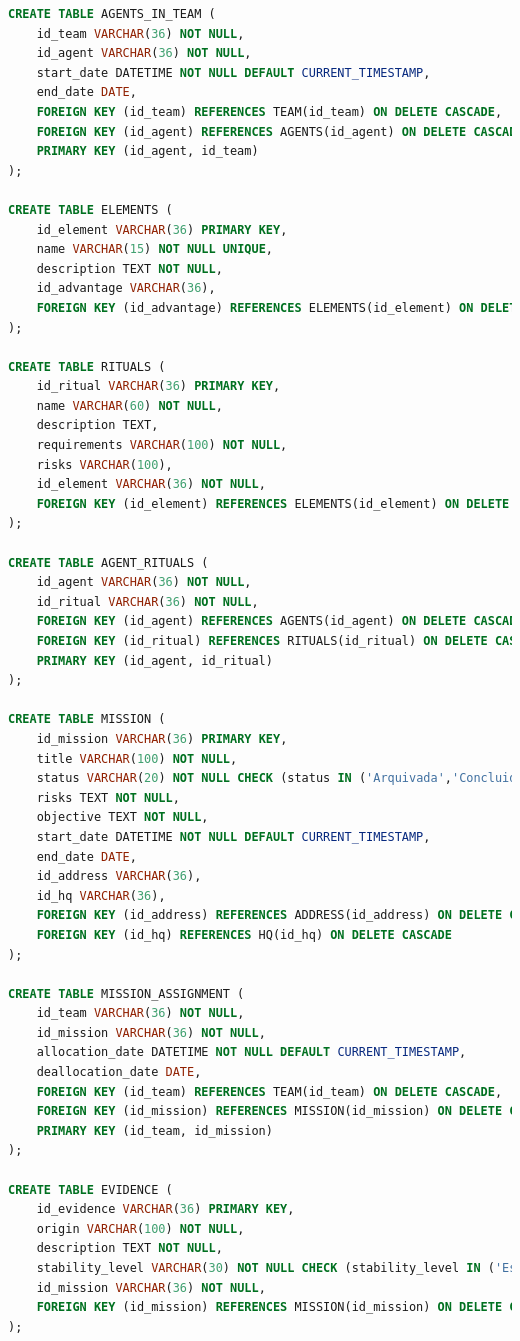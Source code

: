 \documentclass[12pt,a4paper]{report}
\begin{document}
\begin{lstlisting}[language=SQL, caption=ordemdb.sql]
CREATE TABLE AGENTS_IN_TEAM (
    id_team VARCHAR(36) NOT NULL,
    id_agent VARCHAR(36) NOT NULL,
    start_date DATETIME NOT NULL DEFAULT CURRENT_TIMESTAMP,
    end_date DATE,
    FOREIGN KEY (id_team) REFERENCES TEAM(id_team) ON DELETE CASCADE,
    FOREIGN KEY (id_agent) REFERENCES AGENTS(id_agent) ON DELETE CASCADE,
    PRIMARY KEY (id_agent, id_team)
);

CREATE TABLE ELEMENTS (
    id_element VARCHAR(36) PRIMARY KEY,
    name VARCHAR(15) NOT NULL UNIQUE,
    description TEXT NOT NULL,
    id_advantage VARCHAR(36),
    FOREIGN KEY (id_advantage) REFERENCES ELEMENTS(id_element) ON DELETE CASCADE
);

CREATE TABLE RITUALS (
    id_ritual VARCHAR(36) PRIMARY KEY,
    name VARCHAR(60) NOT NULL,
    description TEXT,
    requirements VARCHAR(100) NOT NULL,
    risks VARCHAR(100),
    id_element VARCHAR(36) NOT NULL,
    FOREIGN KEY (id_element) REFERENCES ELEMENTS(id_element) ON DELETE CASCADE
);

CREATE TABLE AGENT_RITUALS (
    id_agent VARCHAR(36) NOT NULL,
    id_ritual VARCHAR(36) NOT NULL,
    FOREIGN KEY (id_agent) REFERENCES AGENTS(id_agent) ON DELETE CASCADE,
    FOREIGN KEY (id_ritual) REFERENCES RITUALS(id_ritual) ON DELETE CASCADE,
    PRIMARY KEY (id_agent, id_ritual)
);

CREATE TABLE MISSION (
    id_mission VARCHAR(36) PRIMARY KEY,
    title VARCHAR(100) NOT NULL,
    status VARCHAR(20) NOT NULL CHECK (status IN ('Arquivada','Concluida','Aberta')) DEFAULT 'Aberta',
    risks TEXT NOT NULL,
    objective TEXT NOT NULL,
    start_date DATETIME NOT NULL DEFAULT CURRENT_TIMESTAMP,
    end_date DATE,
    id_address VARCHAR(36),
    id_hq VARCHAR(36),
    FOREIGN KEY (id_address) REFERENCES ADDRESS(id_address) ON DELETE CASCADE,
    FOREIGN KEY (id_hq) REFERENCES HQ(id_hq) ON DELETE CASCADE
);

CREATE TABLE MISSION_ASSIGNMENT (
    id_team VARCHAR(36) NOT NULL,
    id_mission VARCHAR(36) NOT NULL,
    allocation_date DATETIME NOT NULL DEFAULT CURRENT_TIMESTAMP,
    deallocation_date DATE,
    FOREIGN KEY (id_team) REFERENCES TEAM(id_team) ON DELETE CASCADE,
    FOREIGN KEY (id_mission) REFERENCES MISSION(id_mission) ON DELETE CASCADE,
    PRIMARY KEY (id_team, id_mission)
);

CREATE TABLE EVIDENCE (
    id_evidence VARCHAR(36) PRIMARY KEY,
    origin VARCHAR(100) NOT NULL,
    description TEXT NOT NULL,
    stability_level VARCHAR(30) NOT NULL CHECK (stability_level IN ('Estavel', 'Volatil', 'Perigoso', 'Contido')),
    id_mission VARCHAR(36) NOT NULL,
    FOREIGN KEY (id_mission) REFERENCES MISSION(id_mission) ON DELETE CASCADE
);


\end{lstlisting}
\end{document}
